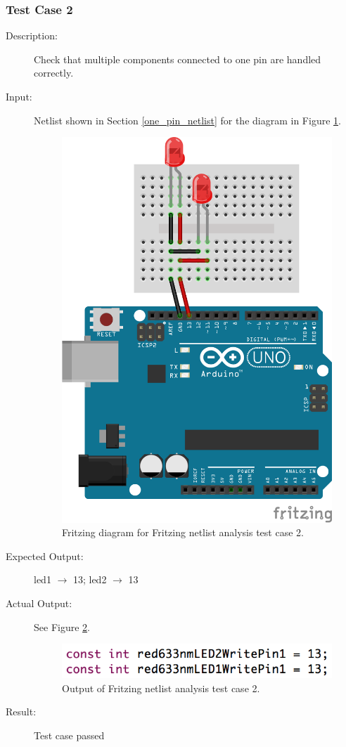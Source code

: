 \documentclass{UoYCSproject}
\begin{document}
\subsubsection{Test Case 2}
\begin{description}
\item[Description:] Check that multiple components connected to one pin are handled correctly.
\item[Input:] Netlist shown in Section \ref{one_pin_netlist} for the diagram in Figure \ref{fig:one_pin_diagram}.
\begin{figure}[h!]
  \centering
  \includegraphics[width=0.3\linewidth]{graphics/One_Pin.png}
  \caption{Fritzing diagram for Fritzing netlist analysis test case 2.}
  \label{fig:one_pin_diagram}
\end{figure}
\item[Expected Output:] led1 $\rightarrow$ 13; led2 $\rightarrow$ 13
\item[Actual Output:] See Figure \ref{fig:one_pin_out}.
\begin{figure}[h!]
  \centering
  \includegraphics[width=0.5\linewidth]{graphics/one_pin_out.png}
  \caption{Output of Fritzing netlist analysis test case 2.}
  \label{fig:one_pin_out}
\end{figure}
\item[Result:] Test case passed
\end{description}
\end{document}
